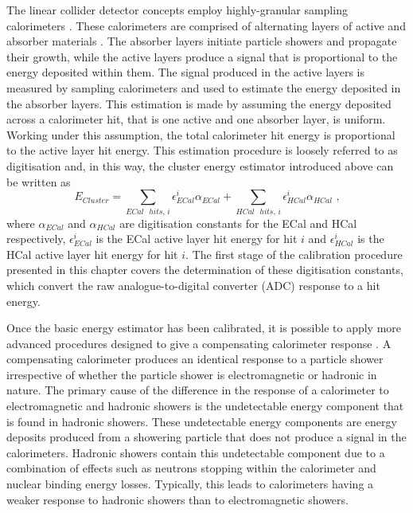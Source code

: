 The linear collider detector concepts employ highly-granular sampling calorimeters \cite{Behnke:2013lya,Linssen:2012hp}.  These calorimeters are comprised of alternating layers of active and absorber materials \cite{Fabjan:2003aq}.  The absorber layers initiate particle showers and propagate their growth, while the active layers produce a signal that is proportional to the energy deposited within them.  The signal produced in the active layers is measured by sampling calorimeters and used to estimate the energy deposited in the absorber layers.  This estimation is made by assuming the energy deposited across a calorimeter hit, that is one active and one absorber layer, is uniform.  Working under this assumption, the total calorimeter hit energy is proportional to the active layer hit energy.  This estimation procedure is loosely referred to as digitisation and, in this way, the cluster energy estimator introduced above can be written as
%
\begin{equation}
E_{Cluster} = \sum_{ECal \text{ } hits \text{, }i} \epsilon^{i}_{ECal} \alpha_{ECal} + \sum_{HCal \text{ } hits \text{, }i} \epsilon^{i}_{HCal} \alpha_{HCal} \text{ ,}
\end{equation}
%
\noindent where $\alpha_{ECal}$ and $\alpha_{HCal}$ are digitisation constants for the ECal and HCal respectively, $\epsilon^{i}_{ECal}$ is the ECal active layer hit energy for hit $i$ and $\epsilon^{i}_{HCal}$ is the HCal active layer hit energy for hit $i$.  The first stage of the calibration procedure presented in this chapter covers the determination of these digitisation constants, which convert the raw analogue-to-digital converter (ADC) response to a hit energy.

Once the basic energy estimator has been calibrated, it is possible to apply more advanced procedures designed to give a compensating calorimeter response \cite{arXiv:0907.3577}.  A compensating calorimeter produces an identical response to a particle shower irrespective of whether the particle shower is electromagnetic or hadronic in nature.  The primary cause of the difference in the response of a calorimeter to electromagnetic and hadronic showers is the undetectable energy component that is found in hadronic showers.  These undetectable energy components are energy deposits produced from a showering particle that {does} not produce a signal in the calorimeters.  Hadronic showers contain this undetectable component due to a combination of effects such as neutrons stopping within the calorimeter and nuclear binding energy losses.  Typically, this leads to calorimeters having a weaker response to hadronic showers than to electromagnetic showers.  

